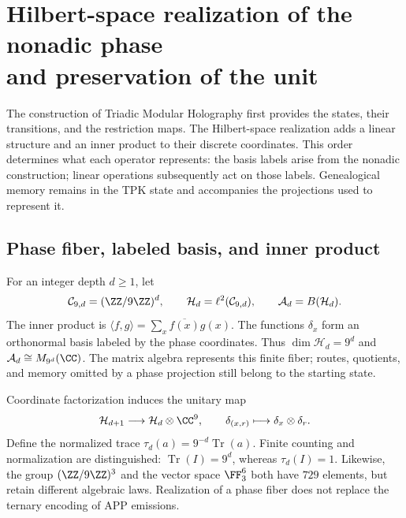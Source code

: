 \section[Hilbert-space realization of the nonadic phase and preservation of the unit]{Hilbert-space realization of the nonadic phase\protect\\and preservation of the unit}
\label{iv:hilbert}

The construction of Triadic Modular Holography first provides
the states, their transitions, and the restriction maps. The Hilbert-space
realization adds a linear structure and an inner
product to their discrete coordinates. This order determines what each operator represents:
the basis labels arise from the nonadic construction;
linear operations subsequently act on those labels. Genealogical
memory remains in the TPK state and accompanies the projections
used to represent it.

\subsection{Phase fiber, labeled basis, and inner product}

For an integer depth \(d\geq1\), let
\begin{equation}
 \mathcal C_{9,d}=(\ZZ/9\ZZ)^d,
 \qquad \mathcal H_d=\ell^2(\mathcal C_{9,d}),
 \qquad \mathcal A_d=B(\mathcal H_d).
 \label{iv:eq:hilbert-finito}
\end{equation}
The inner product is
\(\langle f,g\rangle=\sum_x\overline{f(x)}g(x)\). The functions
\(\delta_x\) form an orthonormal basis labeled by the phase
coordinates. Thus \(\dim\mathcal H_d=9^d\) and
\(\mathcal A_d\cong M_{9^d}(\CC)\). The matrix algebra represents
this finite fiber; routes, quotients, and memory omitted by a
phase projection still belong to the starting state.

Coordinate factorization induces the unitary map
\begin{equation}
 \mathcal H_{d+1}\longrightarrow\mathcal H_d\otimes\CC^9,
 \qquad \delta_{(x,r)}\longmapsto\delta_x\otimes\delta_r.
 \label{iv:eq:factorizacion-hilbert}
\end{equation}
Define the normalized trace
\(\tau_d(a)=9^{-d}\operatorname{Tr}(a)\). Finite counting and
normalization are distinguished: \(\operatorname{Tr}(I)=9^d\), whereas
\(\tau_d(I)=1\). Likewise, the group \((\ZZ/9\ZZ)^3\) and the
vector space \(\FF_3^6\) both have \(729\) elements, but
retain different algebraic laws. Realization of a phase
fiber does not replace the ternary encoding of APP emissions.


